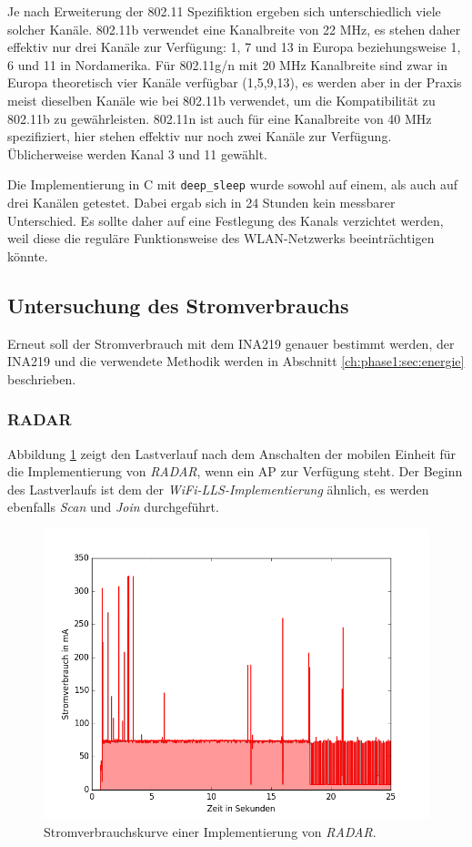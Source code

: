 Je nach Erweiterung der 802.11 Spezifiktion ergeben sich unterschiedlich viele solcher Kanäle.
802.11b verwendet eine Kanalbreite von 22 MHz, es stehen daher effektiv nur drei Kanäle zur Verfügung: 1, 7 und 13 in Europa beziehungsweise 1, 6 und 11 in Nordamerika.
Für 802.11g/n mit 20 MHz Kanalbreite sind zwar in Europa theoretisch vier Kanäle verfügbar (1,5,9,13), es werden aber in der Praxis meist dieselben Kanäle wie bei 802.11b verwendet, um die Kompatibilität zu 802.11b zu gewährleisten.
802.11n ist auch für eine Kanalbreite von 40 MHz spezifiziert, hier stehen effektiv nur noch zwei Kanäle zur Verfügung. 
Üblicherweise werden Kanal 3 und 11 gewählt.

Die Implementierung in C mit \texttt{deep\_sleep} wurde sowohl auf einem, als auch auf drei Kanälen getestet.
Dabei ergab sich in 24 Stunden kein messbarer Unterschied.
Es sollte daher auf eine Festlegung des Kanals verzichtet werden, weil diese die reguläre Funktionsweise des WLAN-Netzwerks beeinträchtigen könnte.


\subsection{Untersuchung des Stromverbrauchs}
Erneut soll der Stromverbrauch mit dem INA219 genauer bestimmt werden, der INA219 und die verwendete Methodik werden in Abschnitt \ref{ch:phase1:sec:energie} beschrieben.


\subsubsection{RADAR}
\label{ch:phase2:sec:powerradar}
Abbildung \ref{fig:radar5s} zeigt den Lastverlauf nach dem Anschalten der mobilen Einheit für die Implementierung von \emph{RADAR}, wenn ein AP zur Verfügung steht. 
Der Beginn des Lastverlaufs ist dem der \emph{WiFi-LLS-Implementierung} ähnlich, es werden ebenfalls \emph{Scan} und \emph{Join} durchgeführt.

\begin{figure}[h!]
  \centering
	\includegraphics[width=\textwidth]{plots/radar5s.png}
  \caption{Stromverbrauchskurve einer Implementierung von \emph{RADAR}.}
  \label{fig:radar5s}
\end{figure}

